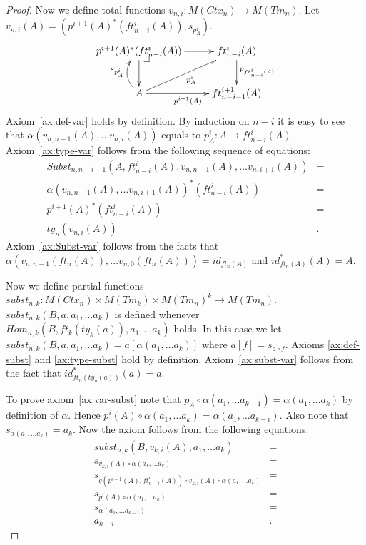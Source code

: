 \documentclass[reqno]{amsart}
\makeatletter
\theoremstyle{definition}
\theoremstyle{remark}
\numberwithin{figure}{section}
\newcommand{\pb}[1][dr]{\save*!/#1-1.2pc/#1:(-1,1)@^{|-}\restore}
\makeatother
\begin{document}
\begin{proof}
Now we define total functions $v_{n,i} : M(Ctx_n) \to M(Tm_n)$.
Let $v_{n,i}(A) = (p^{i+1}(A)^*(ft^i_{n-i}(A)), s_{p^i_A})$.
\[ \xymatrix{ p^{i+1}(A)^*(ft^i_{n-i}(A)) \ar[r] \ar[d] \pb & ft^i_{n-i}(A) \ar[d]^{p_{ft^i_{n-i}(A)}} \\
              A \ar[r]_{p^{i+1}(A)} \ar@/^1pc/[u]^{s_{p^i_A}} \ar[ur]_{p^i_A} & ft^{i+1}_{n-i-1}(A)
            } \]
Axiom~\eqref{ax:def-var} holds by definition.
By induction on $n - i$ it is easy to see that $\alpha(v_{n,n-1}(A), \ldots v_{n,i}(A))$ equals to $p_A^i : A \to ft^i_{n-i}(A)$.
Axiom~\eqref{ax:type-var} follows from the following sequence of equations:
\begin{align*}
Subst_{n,n-i-1}(A, ft^i_{n-i}(A), v_{n,n-1}(A), \ldots v_{n,i+1}(A)) & = \\
\alpha(v_{n,n-1}(A), \ldots v_{n,i+1}(A))^*(ft^i_{n-i}(A)) & = \\
p^{i+1}(A)^*(ft^i_{n-i}(A)) & = \\
ty_n(v_{n,i}(A)) & .
\end{align*}
Axiom~\eqref{ax:Subst-var} follows from the facts that $\alpha(v_{n,n-1}(ft_n(A)), \ldots v_{n,0}(ft_n(A))) = id_{ft_n(A)}$ and $id_{ft_n(A)}^*(A) = A$.

Now we define partial functions $subst_{n,k} : M(Ctx_n) \times M(Tm_k) \times M(Tm_n)^k \to M(Tm_n)$.
$subst_{n,k}(B, a, a_1, \ldots a_k)$ is defined whenever  $Hom_{n,k}(B, ft_k(ty_k(a)), a_1, \ldots a_k)$ holds.
In this case we let $subst_{n,k}(B, a, a_1, \ldots a_k) = a[\alpha(a_1, \ldots a_k)]$ where $a[f] = s_{a \circ f}$.
Axioms \eqref{ax:def-subst} and \eqref{ax:type-subst} hold by definition.
Axiom~\eqref{ax:subst-var} follows from the fact that $id_{ft_n(ty_n(a))}^*(a) = a$.

To prove axiom~\eqref{ax:var-subst} note that $p_A \circ \alpha(a_1, \ldots a_{k+1}) = \alpha(a_1, \ldots a_k)$ by definition of $\alpha$.
Hence $p^i(A) \circ \alpha(a_1, \ldots a_k) = \alpha(a_1, \ldots a_{k-i})$.
Also note that $s_{\alpha(a_1, \ldots a_k)} = a_k$.
Now the axiom follows from the following equations:
\begin{align*}
subst_{n,k}(B, v_{k,i}(A), a_1, \ldots a_k) & = \\
s_{v_{k,i}(A) \circ \alpha(a_1, \ldots a_k)} & = \\
s_{q(p^{i+1}(A), ft^i_{n-i}(A)) \circ v_{k,i}(A) \circ \alpha(a_1, \ldots a_k)} & = \\
s_{p^i(A) \circ \alpha(a_1, \ldots a_k)} & = \\
s_{\alpha(a_1, \ldots a_{k-i})} & = \\
a_{k-i} & .
\end{align*}


\end{proof}
\end{document}
